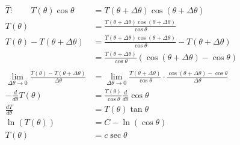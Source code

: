 \documentclass[letter,11pt]{article}
\begin{document}
\begin{align*}
  \hat T: \qquad T(\theta)\cos\theta & = T(\theta + \Delta \theta)\cos(\theta + \Delta \theta) \\
  T(\theta) & = \frac{T(\theta + \Delta \theta)\cos(\theta + \Delta \theta)}{\cos\theta} \\
  T(\theta) - T(\theta + \Delta\theta)& = \frac{T(\theta + \Delta \theta)\cos(\theta + \Delta \theta)}{\cos\theta} - T(\theta + \Delta \theta) \\
    & = \frac{T(\theta + \Delta \theta)}{\cos\theta}(\cos(\theta + \Delta \theta) - \cos\theta) \\
  \\
  \lim_{\Delta\theta\rightarrow 0}\frac{T(\theta) - T(\theta + \Delta\theta)}{\Delta \theta} & = \lim_{\Delta\theta\rightarrow 0}\frac{T(\theta + \Delta \theta)}{\cos\theta}\cdot \frac{\cos(\theta + \Delta \theta) - \cos\theta}{\Delta\theta} \\
  -\frac{d}{d \theta}T(\theta) & = \frac{T(\theta)}{\cos\theta}\frac{d}{d\theta}\cos\theta \\
  \frac{d T}{d \theta} & = T(\theta)\tan\theta \\
  \ln\left(T(\theta)\right) & = C - \ln\left(\cos\theta\right) \\
  T(\theta) & = c \sec \theta
\end{align*}
\end{document}
